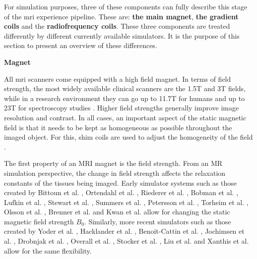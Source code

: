 \hfill

For simulation purposes, three of these components can fully describe this stage of the \ac{mri} experience pipeline.
These are: \textbf{the main magnet}, \textbf{the gradient coils} and the \textbf{radiofrequency coils}.
These three components are treated differently by different currently available simulators.
It is the purpose of this section to present an overview of these differences.

\hfill

\large \textbf{Magnet} \normalsize

All \ac{mri} scanners come equipped with a high field magnet.
In terms of field strength, the most widely available clinical scanners are the 1.5T and 3T fields, while in a research environment they can go up to 11.7T for humans and up to 23T for spectroscopy studies \cite{Morrow2000}.
Higher field strengths generally improve image resolution and contrast.
In all cases, an important aspect of the static magnetic field is that it needs to be kept as homogeneous as possible throughout the imaged object.
For this, shim coils are used to adjust the homogeneity of the field \cite{Romeo1984}.

\hfill

The first property of an MRI magnet is the field strength. 
From an MR simulation perspective, the change in field strength affects the relaxation constants of the tissues being imaged.
Early simulator systems such as those created by
Bittoun et al. \cite{Bittoun1984},
Ortendahl et al. \cite{Ortendahl1984},
Riederer et al. \cite{Riederer1984},
Bobman et al. \cite{Bobman1985},
Lufkin et al. \cite{Lufkin1986},
Stewart et al. \cite{Stewart1986},
Summers et al. \cite{Summers1986},
Petersson et al. \cite{Petersson1993},
Torheim et al. \cite{Torheim1994}, 
Olsson et al. \cite{Olsson1995},
Brenner et al. \cite{Brenner1997} and
Kwan et al. \cite{Kwan1997} allow for changing the static magnetic field strength $B_0$.
Similarly, more recent simulators such as those created by
Yoder et al. \cite{Yoder2004},
Hacklander et al. \cite{Hacklander2005},
Benoit-Cattin et al. \cite{Benoit-Cattin2005},
Jochimsen et al. \cite{Jochimsen2004},
Drobnjak et al. \cite{Drobnjak2006},
Overall et al. \cite{Overall2007},
Stocker et al. \cite{Stocker2010},
Liu et al. \cite{Liu2013} and 
Xanthis et al. \cite{Xanthis2014} allow for the same flexibility.

